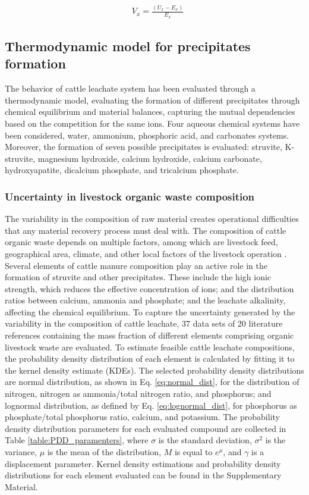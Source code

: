 \begin{refsection}[referencesCh3]
\begin{align}
& V_{x} =\frac{\left(U_{x} - E_{x}\right)}{E_{x}} \label{eq:TESPaperGeo}
\end{align}

\subsection{Thermodynamic model for precipitates formation} \label{thermo_model}
The behavior of cattle leachate system has been evaluated through a thermodynamic model, evaluating the formation of different precipitates through chemical equilibrium and material balances, capturing the mutual dependencies based on the competition for the same ions. Four aqueous chemical systems have been considered, water, ammonium, phosphoric acid, and carbonates systems. Moreover, the formation of seven possible precipitates is evaluated: struvite, K-struvite, magnesium hydroxide, calcium hydroxide, calcium carbonate, hydroxyapatite, dicalcium phosphate, and tricalcium phosphate.

\subsubsection{Uncertainty in livestock organic waste composition} \label{comp_dist}
The variability in the composition of raw material creates operational difficulties that any material recovery process must deal with. The composition of cattle organic waste depends on multiple factors, among which are livestock feed, geographical area, climate, and other local factors of the livestock operation \citep{Tao}. Several elements of cattle manure composition play an active role in the formation of struvite and other precipitates. These include the high ionic strength, which reduces the effective concentration of ions; and the distribution ratios between calcium, ammonia and phosphate; and the leachate alkalinity, affecting the chemical equilibrium. To capture the uncertainty generated by the variability in the composition of cattle leachate, 37 data sets of 20 literature references containing the mass fraction of different elements comprising organic livestock waste are evaluated. To estimate feasible cattle leachate compositions, the probability density distribution of each element is calculated by fitting it to the kernel density estimate (KDEs). The selected probability density distributions are normal distribution, as shown in Eq. \ref{eq:normal_dist}, for the distribution of nitrogen, nitrogen as ammonia/total nitrogen ratio, and phosphorus; and lognormal distribution, as defined by  Eq. \ref{eq:lognormal_dist}, for phosphorus as phosphate/total phosphorus ratio, calcium, and potassium. The probability density distribution parameters for each evaluated compound are collected in Table \ref{table:PDD_paramenters}, where $\sigma$ is the standard deviation, $\sigma^2$ is the variance, $\mu$ is the mean of the distribution, $M$ is equal to $e^{\mu}$, and $\gamma$ is a displacement parameter. Kernel density estimations and probability density distributions for each element evaluated can be found in the Supplementary Material. 


\end{refsection}
